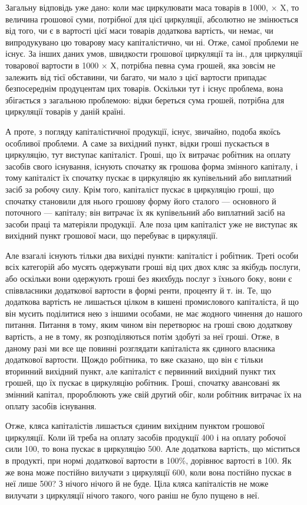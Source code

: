 
Загальну відповідь уже дано: коли має циркулювати маса товарів в
1000, × X, то величина грошової суми, потрібної для цієї циркуляції,
абсолютно не змінюється від того, чи є в вартості цієї маси товарів
додаткова вартість, чи немає, чи випродукувано цю товарову масу
капіталістично, чи ні. Отже, самої проблеми не існує. За інших
даних умов, швидкости грошової циркуляції та ін., для циркуляції товарової
вартости в 1000 × Х, потрібна певна сума грошей, яка
зовсім не залежить від тієї обставини, чи багато, чи мало з цієї вартосги
припадає безпосереднім продуцентам цих товарів. Оскільки тут і існує
проблема, вона збігається з загальною проблемою: відки береться сума
грошей, потрібна для циркуляції товарів у даній країні.

А проте, з погляду капіталістичної продукції, існує, звичайно, подоба
якоїсь особливої проблеми. А саме за вихідний пункт, відки гроші пускається
в циркуляцію, тут виступає капіталіст. Гроші, що їх витрачає
робітник на оплату засобів свого існування, існують спочатку як грошова
форма змінного капіталу, і тому капіталіст їх спочатку пускає в
циркуляцію як купівельний або виплатний засіб за робочу силу. Крім
того, капіталіст пускає в циркуляцію гроші, що спочатку становили для
нього грошову форму його сталого — основного й поточного — капіталу;
він витрачає їх як купівельний або виплатний засіб на засоби праці та
матеріяли продукції. Але поза цим капіталіст уже не виступає як вихідний
пункт грошової маси, що перебуває в циркуляції.

Але взагалі існують тільки два вихідні пункти: капіталіст і робітник.
Треті особи всіх категорій або мусять одержувати гроші від цих двох
кляс за якібудь послуги, або оскільки вони одержують гроші без якихбудь
послуг з їхнього боку, вони є співвласники додаткової вартости в
формі ренти, проценту й т. ін. Те, що додаткова вартість не лишається
цілком в кишені промислового капіталіста, й що він мусить поділитися
нею з іншими особами, не має жодного чинення до нашого питання.
Питання в тому, яким чином він перетворює на гроші свою додаткову
вартість, а не в тому, як розподіляються потім здобуті за неї гроші.
Отже, в даному разі ми все ще повинні розглядати капіталіста як єдиного
власника додаткової вартости. Щождо робітника, то вже сказано, що
він є тільки вторинний вихідний пункт, але капіталіст є первинний
вихідний пункт тих грошей, що їх пускає в циркуляцію робітник. Гроші,
спочатку авансовані як змінний капітал, пророблюють уже свій другий
обіг, коли робітник витрачає їх на оплату засобів існування.

Отже, кляса капіталістів лишається єдиним вихідним пунктом грошової
циркуляції. Коли їй треба на оплату засобів продукції 400
і на оплату робочої сили 100, то вона пускає в циркуляцію
500. Але додаткова вартість, що міститься в продукті, при нормі
додаткової вартости в 100\%, дорівнює вартості в 100. Як
же вона може постійно вилучати з циркуляції 600, коли
вона постійно пускає в неї лише 500? З нічого нічого й не
буде. Ціла кляса капіталістів не може вилучати з циркуляції нічого такого,
чого раніш не було пущено в неї.
